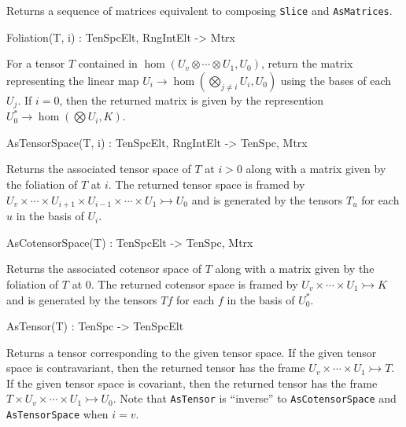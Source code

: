 Returns a sequence of matrices equivalent to composing {\tt Slice} and {\tt AsMatrices}.

\begin{intrinsics}
Foliation(T, i) : TenSpcElt, RngIntElt -> Mtrx
\end{intrinsics}

For a tensor $T$ contained in $\hom(U_v\otimes \cdots \otimes U_1,U_0)$,
return the matrix representing the linear map 
$U_i\rightarrow \hom(\bigotimes_{j\ne i}U_i,U_0)$ using the bases of each $U_j$.
If $i=0$, then the returned matrix is given by the represention 
$U_0^*\rightarrow \hom(\bigotimes U_i,K)$.

\begin{intrinsics}
AsTensorSpace(T, i) : TenSpcElt, RngIntElt -> TenSpc, Mtrx
\end{intrinsics}

Returns the associated tensor space of $T$ at $i>0$ along with a matrix given by
the foliation of $T$ at $i$. 
The returned tensor space is framed by 
$U_v\times \cdots \times U_{i+1}\times U_{i-1}\times \cdots \times U_1\rightarrowtail U_0$
and is generated by the tensors $T_u$ for each $u$ in the basis of $U_i$.

\begin{intrinsics}
AsCotensorSpace(T) : TenSpcElt -> TenSpc, Mtrx
\end{intrinsics}

Returns the associated cotensor space of $T$ along with a matrix given by
the foliation of $T$ at $0$. 
The returned cotensor space is framed by 
$U_v\times \cdots \times U_1\rightarrowtail K$
and is generated by the tensors $Tf$ for each $f$ in the basis of $U_0^*$.

\begin{intrinsics}
AsTensor(T) : TenSpc -> TenSpcElt
\end{intrinsics}

Returns a tensor corresponding to the given tensor space. 
If the given tensor space is contravariant, then the returned tensor has the frame $U_v\times \cdots \times U_1\rightarrowtail T$.
If the given tensor space is covariant, then the returned tensor has the frame $T\times U_v\times \cdots \times U_1\rightarrowtail U_0$.
Note that {\tt AsTensor} is ``inverse'' to {\tt AsCotensorSpace} and {\tt AsTensorSpace} when $i=v$.

